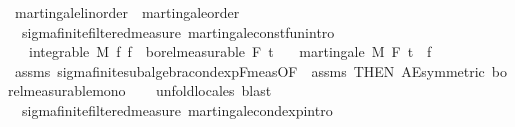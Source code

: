 \begin{isabellebody}
\isamarkupfalse%
\ martingale{\isacharunderscore}{\kern0pt}linorder\ {\isasymsubseteq}\ martingale{\isacharunderscore}{\kern0pt}order%
\isadelimproof
\ %
\endisadelimproof
%
\isatagproof
\isacommand{{\isachardot}{\kern0pt}{\isachardot}{\kern0pt}}\isamarkupfalse%
%
\endisatagproof
{\isafoldproof}%
%
\isadelimproof
%
\endisadelimproof
\isanewline
\isanewline
{}\isamarkupfalse%
\ {\isacharparenleft}{\kern0pt}\ sigma{\isacharunderscore}{\kern0pt}finite{\isacharunderscore}{\kern0pt}filtered{\isacharunderscore}{\kern0pt}measure{\isacharparenright}{\kern0pt}\ martingale{\isacharunderscore}{\kern0pt}const{\isacharunderscore}{\kern0pt}fun{\isacharbrackleft}{\kern0pt}intro{\isacharbrackright}{\kern0pt}{\isacharcolon}{\kern0pt}\ \ \isanewline
\ \ \ {\isachardoublequoteopen}integrable\ M\ f{\isachardoublequoteclose}\ {\isachardoublequoteopen}f\ {\isasymin}\ borel{\isacharunderscore}{\kern0pt}measurable\ {\isacharparenleft}{\kern0pt}F\ t\isanewline
\ \ \ {\isachardoublequoteopen}martingale\ M\ F\ t\ {\isacharparenleft}{\kern0pt}{\isasymlambda}{\isacharunderscore}{\kern0pt}{\isachardot}{\kern0pt}\ f{\isacharparenright}{\kern0pt}{\isachardoublequoteclose}\isanewline
%
\isadelimproof
\ \ %
\endisadelimproof
%
\isatagproof
{}\isamarkupfalse%
\ assms\ sigma{\isacharunderscore}{\kern0pt}finite{\isacharunderscore}{\kern0pt}subalgebra{\isachardot}{\kern0pt}cond{\isacharunderscore}{\kern0pt}exp{\isacharunderscore}{\kern0pt}F{\isacharunderscore}{\kern0pt}meas{\isacharbrackleft}{\kern0pt}OF\ {\isacharunderscore}{\kern0pt}\ assms{\isacharparenleft}{\kern0pt}{}{\isacharparenright}{\kern0pt}{\isacharcomma}{\kern0pt}\ THEN\ AE{\isacharunderscore}{\kern0pt}symmetric{\isacharbrackright}{\kern0pt}\ borel{\isacharunderscore}{\kern0pt}measurable{\isacharunderscore}{\kern0pt}mono\isanewline
\ \ \isamarkupfalse%
\ {\isacharparenleft}{\kern0pt}unfold{\isacharunderscore}{\kern0pt}locales{\isacharparenright}{\kern0pt}\ blast{\isacharplus}{\kern0pt}%
\endisatagproof
{\isafoldproof}%
%
\isadelimproof
\isanewline
%
\endisadelimproof
\isanewline
{}\isamarkupfalse%
\ {\isacharparenleft}{\kern0pt}\ sigma{\isacharunderscore}{\kern0pt}finite{\isacharunderscore}{\kern0pt}filtered{\isacharunderscore}{\kern0pt}measure{\isacharparenright}{\kern0pt}\ martingale{\isacharunderscore}{\kern0pt}cond{\isacharunderscore}{\kern0pt}exp{\isacharbrackleft}{\kern0pt}intro{\isacharbrackright}{\kern0pt}{\isacharcolon}{\kern0pt}\ \ \isanewline

\end{isabellebody}
